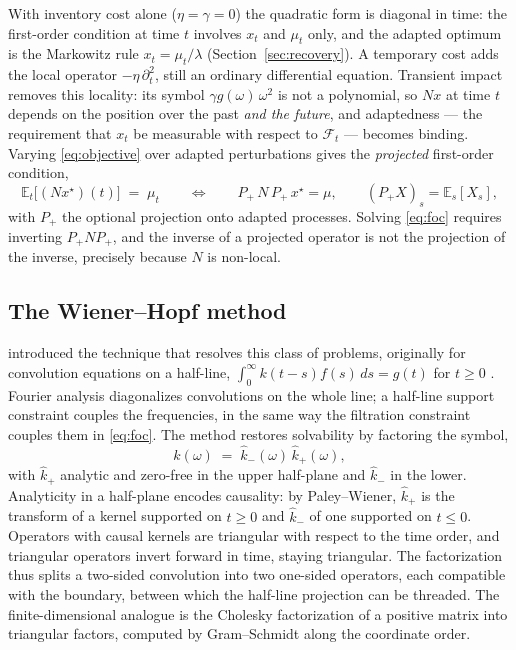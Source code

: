 \documentclass[11pt]{article}
\newcommand{\E}{\mathbb{E}}
\newcommand{\F}{\mathcal{F}}
\theoremstyle{plain}
\theoremstyle{definition}
\theoremstyle{remark}
\begin{document}
With inventory cost alone ($\eta=\gamma=0$) the quadratic form is diagonal in time: the first-order condition at time $t$ involves $x_t$ and $\mu_t$ only, and the adapted optimum is the Markowitz rule $x_t=\mu_t/\lambda$ (Section~\ref{sec:recovery}). A temporary cost adds the local operator $-\eta\,\partial_t^2$, still an ordinary differential equation. Transient impact removes this locality: its symbol $\gamma\hat g(\omega)\,\omega^2$ is not a polynomial, so $Nx$ at time $t$ depends on the position over the past \emph{and the future}, and adaptedness --- the requirement that $x_t$ be measurable with respect to $\F_t$ --- becomes binding. Varying \eqref{eq:objective} over adapted perturbations gives the \emph{projected} first-order condition,
\begin{equation}\label{eq:foc}
\E_t\bigl[(Nx^\star)(t)\bigr] \;=\; \mu_t
\qquad\Longleftrightarrow\qquad
P_+\,N\,P_+\,x^\star = \mu,
\qquad (P_+X)_s = \E_s[X_s],
\end{equation}
with $P_+$ the optional projection onto adapted processes. Solving \eqref{eq:foc} requires inverting $P_+NP_+$, and the inverse of a projected operator is not the projection of the inverse, precisely because $N$ is non-local.

\subsection{The Wiener--Hopf method}\label{sec:thesis}

\citet{WienerHopf1931} introduced the technique that resolves this class of problems, originally for convolution equations on a half-line, $\int_0^\infty k(t-s)f(s)\,ds=g(t)$ for $t\ge0$ \citep{Krein1962,Noble1958}. Fourier analysis diagonalizes convolutions on the whole line; a half-line support constraint couples the frequencies, in the same way the filtration constraint couples them in \eqref{eq:foc}. The method restores solvability by factoring the symbol,
\[
\hat k(\omega) \;=\; \hat k_-(\omega)\,\hat k_+(\omega),
\]
with $\hat k_+$ analytic and zero-free in the upper half-plane and $\hat k_-$ in the lower. Analyticity in a half-plane encodes causality: by Paley--Wiener, $\hat k_+$ is the transform of a kernel supported on $t\ge0$ and $\hat k_-$ of one supported on $t\le0$. Operators with causal kernels are triangular with respect to the time order, and triangular operators invert forward in time, staying triangular. The factorization thus splits a two-sided convolution into two one-sided operators, each compatible with the boundary, between which the half-line projection can be threaded. The finite-dimensional analogue is the Cholesky factorization of a positive matrix into triangular factors, computed by Gram--Schmidt along the coordinate order.
\end{document}

